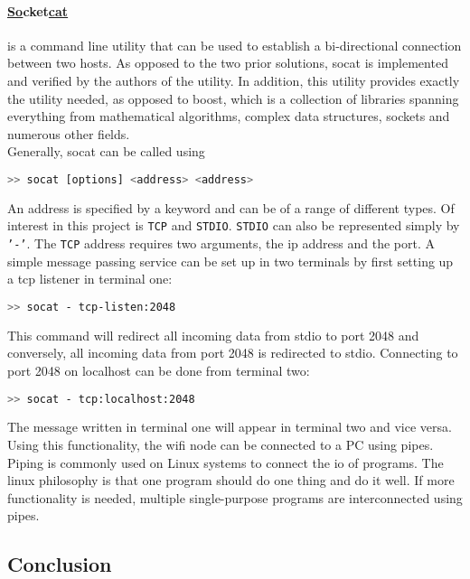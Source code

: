 \paragraph*{\underline{So}cket\underline{cat}} is a command line utility that can be used to establish a bi-directional connection between two hosts.
As opposed to the two prior solutions, socat is implemented and verified by the authors of the utility.
In addition, this utility provides exactly the utility needed, as opposed to boost, which is a collection of libraries spanning everything from mathematical algorithms, complex data structures, sockets and numerous other fields.\\
Generally, socat can be called using
\begin{lstlisting}[language=bash]
>> socat [options] <address> <address>
\end{lstlisting}
An address is specified by a keyword and can be of a range of different types.
Of interest in this project is \texttt{TCP} and \texttt{STDIO}.
\texttt{STDIO} can also be represented simply by \texttt{'-'}.
The \texttt{TCP} address requires two arguments, the ip address and the port.
A simple message passing service can be set up in two terminals by first setting up a tcp listener in terminal one:

\begin{lstlisting}[language=bash]
>> socat - tcp-listen:2048
\end{lstlisting}

This command will redirect all incoming data from stdio to port 2048 and conversely, all incoming data from port 2048 is redirected to stdio. 
Connecting to port 2048 on localhost can be done from terminal two:

\begin{lstlisting}[language=bash]
>> socat - tcp:localhost:2048
\end{lstlisting}

The message written in terminal one will appear in terminal two and vice versa.
Using this functionality, the wifi node can be connected to a PC using pipes.
Piping is commonly used on Linux systems to connect the io of programs.
The linux philosophy is that one program should do one thing and do it well.
If more functionality is needed, multiple single-purpose programs are interconnected using pipes.

\subsection{Conclusion}

